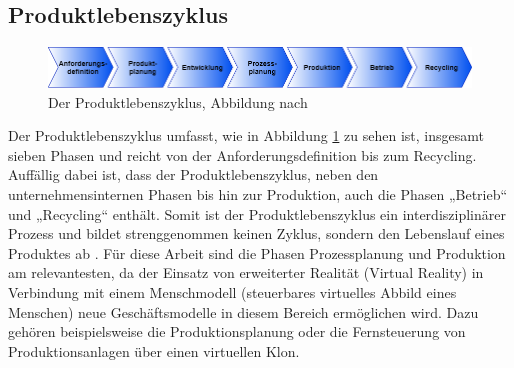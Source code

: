 \subsection{Produktlebenszyklus}\label{sec:Produktlebenszyklus}
\begin{figure}[h]
	\centering
	\includegraphics[width=1\linewidth]{Bilder/A8_Produktlebenszyklus}
	\caption{Der Produktlebenszyklus, Abbildung nach \cite[S.3]{13}}
	\label{fig:Produktlebenszyklus}
\end{figure}
\noindent Der Produktlebenszyklus umfasst, wie in Abbildung \ref{fig:Produktlebenszyklus} zu sehen ist, insgesamt sieben Phasen und reicht von der Anforderungsdefinition bis zum Recycling. Auffällig dabei ist, dass der Produktlebenszyklus, neben den unternehmensinternen Phasen bis hin zur Produktion, auch die Phasen „Betrieb“ und „Recycling“ enthält. Somit ist der Produktlebenszyklus ein interdisziplinärer Prozess und bildet strenggenommen keinen Zyklus, sondern den Lebenslauf eines Produktes ab \cite[S.3]{13}.
\newline
Für diese Arbeit sind die Phasen Prozessplanung und Produktion am relevantesten, da der Einsatz von erweiterter Realität (Virtual Reality) in Verbindung mit einem Menschmodell (steuerbares virtuelles Abbild eines Menschen) neue Geschäftsmodelle in diesem Bereich ermöglichen wird. Dazu gehören beispielsweise die Produktionsplanung oder die Fernsteuerung von Produktionsanlagen über einen virtuellen Klon.

